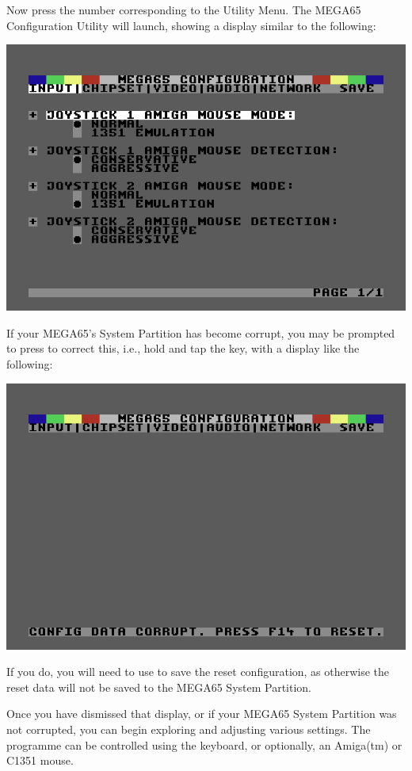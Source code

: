 Now press the number corresponding to the Utility Menu.  The MEGA65
Configuration Utility will launch, showing a display similar to
the following:

\includegraphics[width=\linewidth]{images/ss-m65config-1.png}

If your MEGA65's System Partition has become corrupt, you may be
prompted to press  to correct this, i.e., hold  and tap
the  key, with a display like the following:

\includegraphics[width=\linewidth]{images/ss-m65config-corrupt.png}

If you do, you will
need to use  to save the reset configuration, as otherwise
the reset data will not be saved to the MEGA65 System
Partition.

Once you have dismissed that display, or if your MEGA65 System
Partition was not corrupted, you can begin exploring and adjusting
various settings.  The programme can be controlled using the keyboard, or
optionally, an Amiga(tm) or C1351 mouse.

